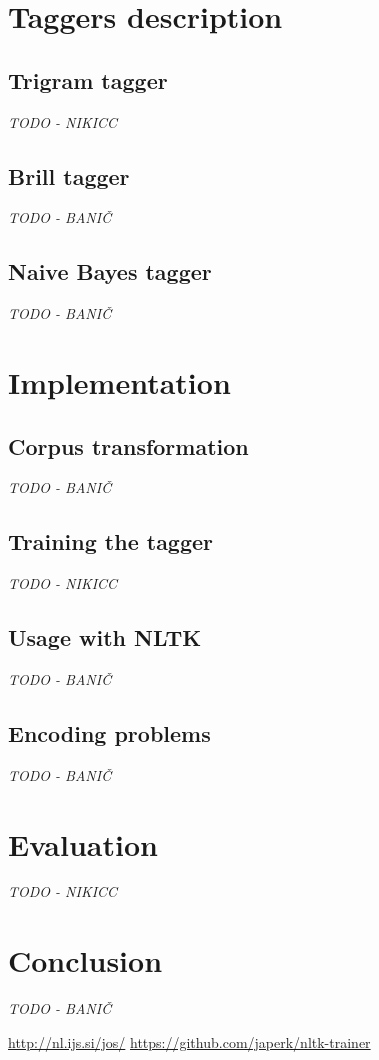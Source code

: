 \documentclass[11pt,a4paper,english,twocolumn]{article}
\begin{document}
\section{Taggers description}
\subsection{Trigram tagger}
\textit{TODO - NIKICC}
\subsection{Brill tagger}
\textit{TODO - BANIČ}
\subsection{Naive Bayes tagger}
\textit{TODO - BANIČ}
\section{Implementation}
\subsection{Corpus transformation}
\textit{TODO - BANIČ}
\subsection{Training the tagger}
\textit{TODO - NIKICC}
\subsection{Usage with NLTK}
\textit{TODO - BANIČ}
\subsection{Encoding problems}
\textit{TODO - BANIČ}
\section{Evaluation}\label{Evaluation}
\textit{TODO - NIKICC}
\section{Conclusion}
\textit{TODO - BANIČ}


\begin{thebibliography}{99}
 \url{http://nl.ijs.si/jos/}
 \url{https://github.com/japerk/nltk-trainer}

\end{thebibliography}
\end{document}
